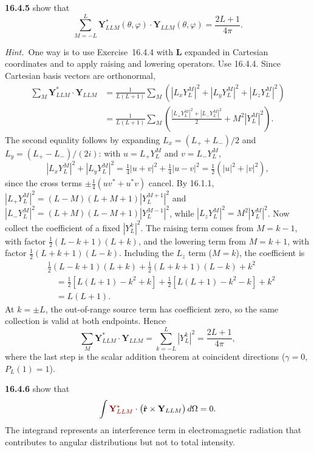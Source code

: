 \par\bigskip
\noindent\textbf{16.4.5}\quad {} show that
\[
\sum_{M=-L}^{L}\mathbf{Y}_{LLM}^{*}(\theta,\varphi)\cdot
\mathbf{Y}_{LLM}(\theta,\varphi)=\frac{2L+1}{4\pi}.
\]
\par\emph{Hint.}~One way is to use Exercise~16.4.4 with $\mathbf{L}$
expanded in Cartesian coordinates and to apply raising and lowering
operators.
\solution
{}
Use 16.4.4. Since Cartesian basis vectors are orthonormal,
\[
\begin{aligned}
\sum_M\mathbf Y_{LLM}^*\cdot\mathbf Y_{LLM}
&=\frac1{L(L+1)}\sum_M
\left(|L_xY_L^M|^2+|L_yY_L^M|^2+|L_zY_L^M|^2\right)\\
&=\frac1{L(L+1)}\sum_M
\left(\frac{|L_+Y_L^M|^2+|L_-Y_L^M|^2}{2}
+M^2|Y_L^M|^2\right).
\end{aligned}
\]
The second equality follows by expanding $L_x=(L_++L_-)/2$
and $L_y=(L_+-L_-)/(2i)$: with $u=L_+Y_L^M$ and $v=L_-Y_L^M$,
\[
|L_xY_L^M|^2+|L_yY_L^M|^2=\tfrac14|u+v|^2+\tfrac14|u-v|^2
=\tfrac12\left(|u|^2+|v|^2\right),
\]
since the cross terms $\pm\frac14(uv^*+u^*v)$ cancel. By 16.1.1,
$|L_+Y_L^M|^2=(L-M)(L+M+1)|Y_L^{M+1}|^2$ and
$|L_-Y_L^M|^2=(L+M)(L-M+1)|Y_L^{M-1}|^2$, while
$|L_zY_L^M|^2=M^2|Y_L^M|^2$.
Now collect the coefficient of a fixed $|Y_L^k|^2$.
The raising term comes from $M=k-1$, with factor
$\frac12(L-k+1)(L+k)$, and the lowering term
from $M=k+1$, with factor $\frac12(L+k+1)(L-k)$. Including the
$L_z$ term ($M=k$), the coefficient is
\[
\begin{aligned}
&\frac12(L-k+1)(L+k)+\frac12(L+k+1)(L-k)+k^2\\
&\quad=\frac12[L(L+1)-k^2+k]
+\frac12[L(L+1)-k^2-k]+k^2\\
&\quad=L(L+1).
\end{aligned}
\]
At $k=\pm L$, the out-of-range source term has coefficient zero,
so the same collection is valid at both endpoints. Hence
\[
\sum_M\mathbf Y_{LLM}^*\cdot\mathbf Y_{LLM}
=\sum_{k=-L}^{L}|Y_L^k|^2
=\boxed{\frac{2L+1}{4\pi}},
\]
where the last step is the scalar addition theorem at coincident
directions ($\gamma=0$, $P_L(1)=1$).

\par\bigskip
\noindent\textbf{16.4.6}\quad {}
show that
\[
\int\erratum{\mathbf{Y}_{LLM}^{*}}\cdot
\big(\hat{\mathbf{r}}\times\mathbf{Y}_{LLM}\big)\,d\Omega=0.
\]
The integrand represents an interference term in electromagnetic
radiation that contributes to angular distributions but not to total
intensity.
\solution
{}

